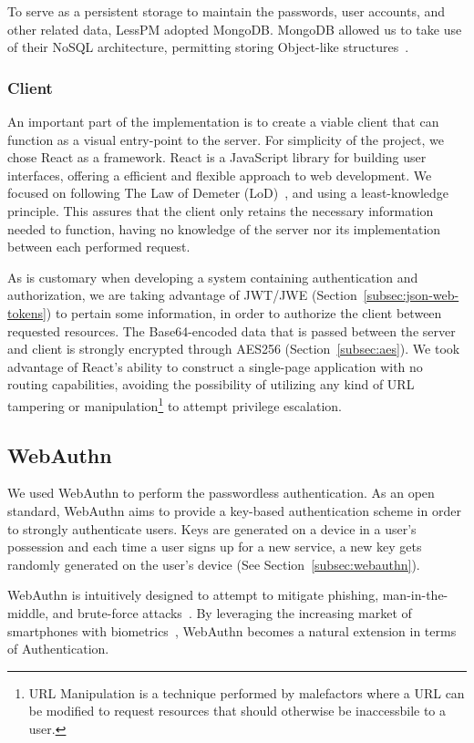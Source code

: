 To serve as a persistent storage to maintain the passwords, user accounts,
and other related data, LessPM adopted MongoDB\@.
MongoDB allowed us to take use of their NoSQL architecture, permitting
storing Object-like structures~\cite{mongodb2021nosql}.

\subsubsection{Client}
An important part of the implementation is to create a viable client that can
function as a visual entry-point to the server.
For simplicity of the project, we chose React as a framework.
React is a JavaScript library for building user interfaces, offering a
efficient and flexible approach to web development.
We focused on following The Law of Demeter (LoD)~\cite{lieberherr1990assuring},
and using a least-knowledge principle.
This assures that the client only retains the necessary information needed to
function, having no knowledge of the server nor its implementation between each
performed request.

As is customary when developing a system containing authentication and
authorization, we are taking advantage of JWT/JWE
(Section~\ref{subsec:json-web-tokens})
to pertain some information, in order to authorize the client between
requested resources.
The Base64-encoded data that is passed between the server and client is
strongly encrypted through AES256 (Section~\ref{subsec:aes}).
We took advantage of React's ability to construct a single-page application with
no routing capabilities, avoiding the possibility of utilizing any kind of URL
tampering or manipulation\footnote{
  URL Manipulation is a technique performed by malefactors where a URL can be
  modified to request resources that should otherwise be inaccessbile to a user.
} to attempt privilege escalation.

\subsection{WebAuthn}\label{subsec:webauthn-methodology}
We used WebAuthn to perform the passwordless authentication.
As an open standard, WebAuthn aims to provide a key-based authentication
scheme in order to strongly authenticate users.
Keys are generated on a device in a user's possession and each time a
user signs up for a new service, a new key gets randomly generated on the
user's device (See Section~\ref{subsec:webauthn}).

WebAuthn is intuitively designed to attempt to mitigate phishing,
man-in-the-middle, and brute-force attacks~\cite{webauthn_level_2}.
By leveraging the increasing market of smartphones with
biometrics~\cite{statista-biometric-transactions}, WebAuthn becomes a natural
extension in terms of Authentication.

